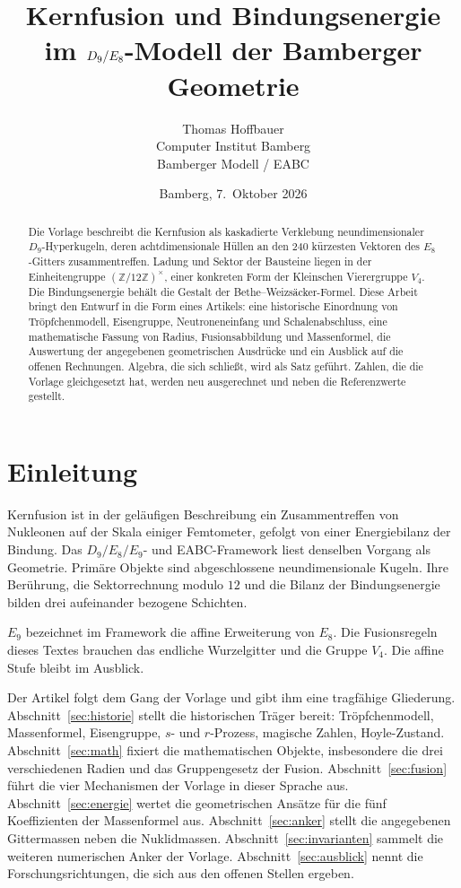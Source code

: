\documentclass[11pt,a4paper]{article}
\title{\textbf{Kernfusion und Bindungsenergie}\\[0.35em]
\large im \(\Dn/\Ee\)-Modell der Bamberger Geometrie}
\author{Thomas Hoffbauer\\[0.25em]
\small Computer Institut Bamberg\\
\small Bamberger Modell / EABC}
\date{Bamberg, 7.\ Oktober 2026}
\theoremstyle{definition}
\theoremstyle{remark}
\newcommand{\Dn}{D_9}
\newcommand{\Ee}{E_8}
\newcommand{\En}{E_9}
\newcommand{\Vf}{V_4}
\begin{document}
\maketitle

\begin{abstract}
\noindent
Die Vorlage beschreibt die Kernfusion als kaskadierte Verklebung neundimensionaler \(\Dn\)-Hyperkugeln, deren achtdimensionale Hüllen an den \(240\) kürzesten Vektoren des \(\Ee\)-Gitters zusammentreffen. Ladung und Sektor der Bausteine liegen in der Einheitengruppe \((\mathbb{Z}/12\mathbb{Z})^{\times}\), einer konkreten Form der Kleinschen Vierergruppe \(\Vf\). Die Bindungsenergie behält die Gestalt der Bethe--Weizsäcker-Formel. Diese Arbeit bringt den Entwurf in die Form eines Artikels: eine historische Einordnung von Tröpfchenmodell, Eisengruppe, Neutroneneinfang und Schalenabschluss, eine mathematische Fassung von Radius, Fusionsabbildung und Massenformel, die Auswertung der angegebenen geometrischen Ausdrücke und ein Ausblick auf die offenen Rechnungen. Algebra, die sich schließt, wird als Satz geführt. Zahlen, die die Vorlage gleichgesetzt hat, werden neu ausgerechnet und neben die Referenzwerte gestellt.
\end{abstract}

\newpage
\tableofcontents
\newpage

\section{Einleitung}
\label{sec:einleitung}

Kernfusion ist in der geläufigen Beschreibung ein Zusammentreffen von Nukleonen auf der Skala einiger Femtometer, gefolgt von einer Energiebilanz der Bindung. Das \(\Dn/\Ee/\En\)- und EABC-Framework liest denselben Vorgang als Geometrie. Primäre Objekte sind abgeschlossene neundimensionale Kugeln. Ihre Berührung, die Sektorrechnung modulo \(12\) und die Bilanz der Bindungsenergie bilden drei aufeinander bezogene Schichten.

\(\En\) bezeichnet im Framework die affine Erweiterung von \(\Ee\). Die Fusionsregeln dieses Textes brauchen das endliche Wurzelgitter und die Gruppe \(\Vf\). Die affine Stufe bleibt im Ausblick.

Der Artikel folgt dem Gang der Vorlage und gibt ihm eine tragfähige Gliederung.
Abschnitt~\ref{sec:historie} stellt die historischen Träger bereit: Tröpfchenmodell, Massenformel, Eisengruppe, \(s\)- und \(r\)-Prozess, magische Zahlen, Hoyle-Zustand.
Abschnitt~\ref{sec:math} fixiert die mathematischen Objekte, insbesondere die drei verschiedenen Radien und das Gruppengesetz der Fusion.
Abschnitt~\ref{sec:fusion} führt die vier Mechanismen der Vorlage in dieser Sprache aus.
Abschnitt~\ref{sec:energie} wertet die geometrischen Ansätze für die fünf Koeffizienten der Massenformel aus.
Abschnitt~\ref{sec:anker} stellt die angegebenen Gittermassen neben die Nuklidmassen.
Abschnitt~\ref{sec:invarianten} sammelt die weiteren numerischen Anker der Vorlage.
Abschnitt~\ref{sec:ausblick} nennt die Forschungsrichtungen, die sich aus den offenen Stellen ergeben.
\end{document}
